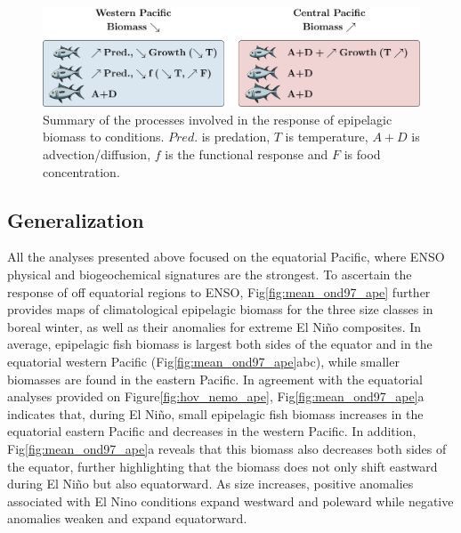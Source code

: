\begin{figure}[h!tp]
	\centering
        \includegraphics[scale=0.6]{figs/conclusion/conlusion_fig.pdf}	
        \caption{Summary of the processes involved in the response of epipelagic biomass to \nino{} conditions.  $Pred.$ is predation, $T$ is temperature, $A+D$ is advection/diffusion, $f$ is the functional response and $F$ is food concentration.}
	\label{fig:proc_summary}
\end{figure}



\subsection{Generalization}

All the analyses presented above focused on the equatorial Pacific, where ENSO physical and biogeochemical signatures are the strongest. To ascertain the response of off equatorial regions to ENSO,  Fig\ref{fig:mean_ond97_ape} further provides maps of climatological epipelagic biomass for the three size classes in boreal winter, as well as their anomalies for extreme El Niño composites.  In average, epipelagic fish biomass is largest both sides of the equator and in the equatorial western Pacific (Fig\ref{fig:mean_ond97_ape}abc), while smaller biomasses  are found in the eastern Pacific. In agreement with the equatorial analyses provided on Figure\ref{fig:hov_nemo_ape}, Fig\ref{fig:mean_ond97_ape}a indicates that, during El Niño, small epipelagic fish biomass increases in the equatorial eastern Pacific and decreases in the western Pacific. In addition, Fig\ref{fig:mean_ond97_ape}a reveals that this biomass also decreases both sides of the equator, further highlighting that the biomass does not only shift eastward during El Niño but also equatorward.
As size increases, positive anomalies associated with El Nino conditions expand westward and poleward while negative anomalies weaken and expand equatorward. 

